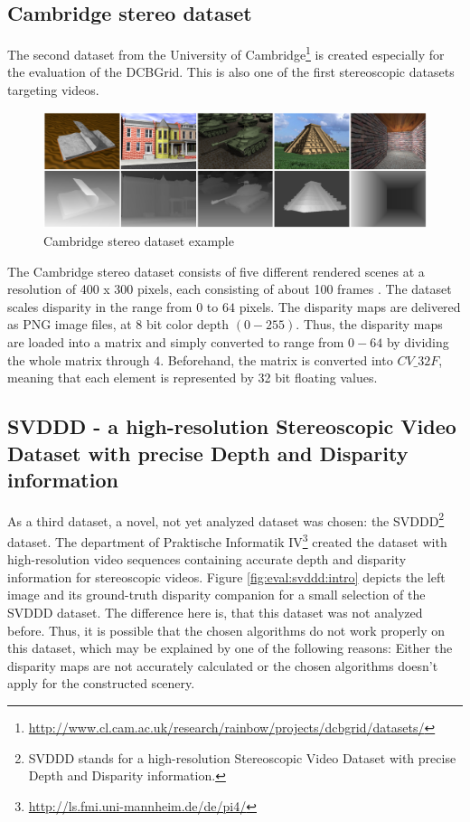 \subsection*{Cambridge stereo dataset}

The second dataset from the University of Cambridge\footnote{\url{http://www.cl.cam.ac.uk/research/rainbow/projects/dcbgrid/datasets/}} is created especially for the evaluation of the DCBGrid.
This is also one of the first stereoscopic datasets targeting videos.

\begin{figure}[h!]
  \centering
  \includegraphics[width=1.0\textwidth]{src/images/dbcgrid-dataset.png}
  \caption[Cambridge stereo dataset example]{Cambridge stereo dataset example}
  \label{fig:dbcgrid-dataset}
\end{figure}

\noindent The Cambridge stereo dataset consists of five different rendered scenes at a resolution of 400 x 300 pixels, each consisting of about 100 frames \citep{richardt2010real}.
The dataset scales disparity in the range from $0$ to $64$ pixels.
The disparity maps are delivered as PNG image files, at 8 bit color depth $(0 - 255)$.
Thus, the disparity maps are loaded into a matrix and simply converted to range from $0-64$ by dividing the whole matrix through $4$.
Beforehand, the matrix is converted into $CV\_32F$, meaning that each element is represented by 32 bit floating values.

\subsection*{SVDDD - a high-resolution Stereoscopic Video Dataset with precise Depth and Disparity information}

As a third dataset, a novel, not yet analyzed dataset was chosen: the SVDDD\footnote{SVDDD stands for a high-resolution Stereoscopic Video Dataset with precise Depth and Disparity information.} dataset.
The department of Praktische Informatik IV\footnote{\url{http://ls.fmi.uni-mannheim.de/de/pi4/}} created the dataset with high-resolution video sequences containing accurate depth and disparity information for stereoscopic videos.
Figure \ref{fig:eval:svddd:intro} depicts the left image and its ground-truth disparity companion for a small selection of the SVDDD dataset.
\newline\newline\noindent The difference here is, that this dataset was not analyzed before.
Thus, it is possible that the chosen algorithms do not work properly on this dataset, which may be explained by one of the following reasons:
Either the disparity maps are not accurately calculated or the chosen algorithms doesn't apply for the constructed scenery.

